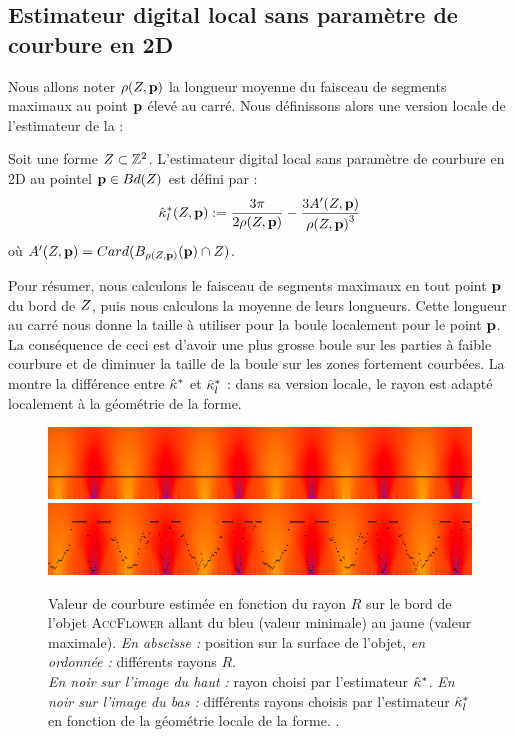 \subsection{Estimateur digital local sans paramètre de courbure en 2D}
%
Nous allons noter $\rho(Z,\mathbf{p})$ la longueur moyenne du faisceau de
segments maximaux au point $\mathbf{p}$ élevé au carré. Nous définissons alors une
version locale de l'estimateur de la
 :
%
\begin{definition}
  Soit une forme $Z \subset \mathbb{Z}^2$. L'estimateur digital local sans
  paramètre de courbure en 2D au pointel $\mathbf{p} \in Bd({Z})$ est défini par :
  \begin{equation}
    \hat{\kappa}^{*}_{l}(Z, \mathbf{p}) := \frac{3\pi}{2 \rho(Z,\mathbf{p})} - \frac{3 A'(Z,\mathbf{p})}{{\rho(Z,\mathbf{p})}^3}
  \end{equation}
  où $A'(Z, \mathbf{p}) = Card(B_{\rho(Z,\mathbf{p})}(\mathbf{p}) \cap
  Z)$.
\end{definition}
%
Pour résumer, nous calculons le faisceau de segments maximaux en tout point
$\mathbf{p}$ du bord de $Z$, puis nous calculons la moyenne de leurs longueurs.
Cette longueur au carré nous donne la taille à utiliser pour la boule localement
pour le point $\mathbf{p}$. La conséquence de ceci est d'avoir une plus grosse boule
sur les parties à faible courbure et de diminuer la taille de la boule sur les
zones fortement courbées. La  montre la
différence entre $\hat{\kappa}^{*}$ et $\hat{\kappa}^{*}_{l}$ : dans sa version locale, le rayon est
adapté localement à la géométrie de la forme.
%
\begin{figure}[ht]{
  \begin{center}
    \includegraphics[width=.95\linewidth]{images/Curvature/ScaleSpace_Flower_Global}
    \includegraphics[width=.95\linewidth]{images/Curvature/ScaleSpace_Flower_Local}
  \end{center}}
  \caption[.]{Valeur de courbure estimée en fonction du rayon $R$ sur le bord de
  l'objet \textsc{AccFlower} allant du bleu (valeur minimale) au jaune (valeur
  maximale). \emph{En abscisse :} position sur la surface de l'objet, \emph{en
  ordonnée :} différents rayons $R$.
  \\
  \emph{En noir sur l'image du haut :} rayon choisi par l'estimateur $\hat{\kappa}^{*}$.
  \emph{En noir sur l'image du bas :} différents rayons choisis par l'estimateur
  $\hat{\kappa}^{*}_{l}$ en fonction de la géométrie locale de la forme.
  \label{fig:curvature-pf-radii}.}
\end{figure}

